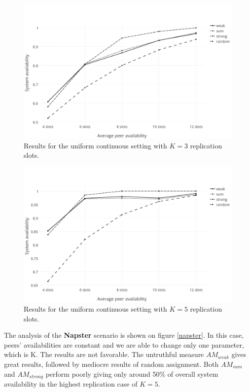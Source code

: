 \documentclass{pracamgren}
\begin{document}
\begin{figure}[h]
\centering
\includegraphics[scale=0.5]{graphs/uni_cont_3.pdf}
\caption{Results for the uniform continuous setting with $K=3$ replication slots.}
\label{uni_cont_3}
\end{figure}

\begin{figure}[h]
\centering
\includegraphics[scale=0.5]{graphs/uni_cont_5.pdf}
\caption{Results for the uniform continuous setting with $K=5$ replication slots.}
\label{uni_cont_5}
\end{figure}

The analysis of the {\bf Napster} scenario is shown on figure \ref{napster}. In this case, peers' availabilities are constant and we are able to change only one parameter, which is K. The results are not favorable. The untruthful measure $AM_{weak}$ gives great results, followed by mediocre results of random assignment. Both $AM_{sum}$ and $AM_{strong}$ perform poorly giving only around 50\% of overall system availability in the highest replication case of $K=5$.\\
\end{document}
